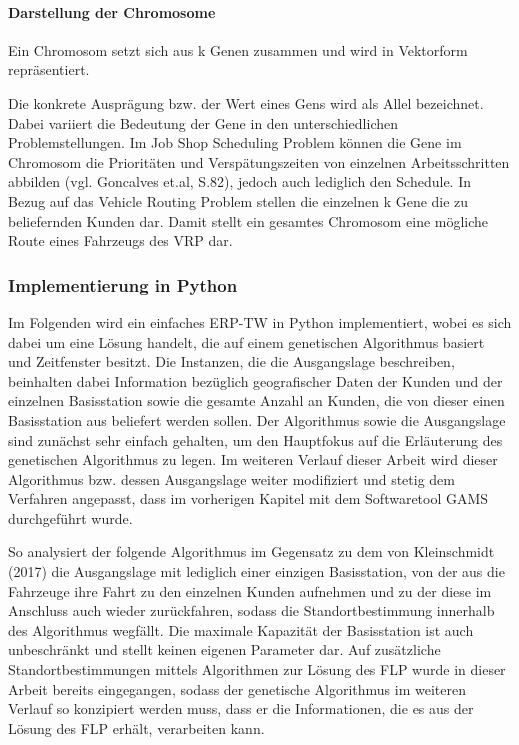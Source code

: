 \documentclass[a4paper,12pt,parskip,bibtotoc,liststotoc]{article}
\begin{document}
\paragraph{Darstellung der Chromosome}

Ein Chromosom setzt sich aus k Genen zusammen und wird in Vektorform repräsentiert. 

Die konkrete Ausprägung bzw. der Wert eines Gens wird als Allel bezeichnet.
Dabei variiert die Bedeutung der Gene in den unterschiedlichen Problemstellungen. 
Im Job Shop Scheduling Problem können die Gene im Chromosom die Prioritäten und Verspätungszeiten von einzelnen Arbeitsschritten abbilden (vgl. Goncalves et.al, S.82), jedoch auch lediglich den Schedule.
In Bezug auf das Vehicle Routing Problem stellen die einzelnen k Gene die zu beliefernden Kunden dar. 
Damit stellt ein gesamtes Chromosom eine mögliche Route eines Fahrzeugs des VRP dar. 


\subsubsection{Implementierung in Python}

Im Folgenden wird ein einfaches ERP-TW in Python implementiert, wobei es sich dabei um eine Lösung handelt, die auf einem genetischen Algorithmus basiert und Zeitfenster besitzt. 
Die Instanzen, die die Ausgangslage beschreiben, beinhalten dabei Information bezüglich geografischer Daten der Kunden und der einzelnen Basisstation sowie die gesamte Anzahl an Kunden, die von dieser einen Basisstation aus beliefert werden sollen.
Der Algorithmus sowie die Ausgangslage sind zunächst sehr einfach gehalten, um den Hauptfokus auf die Erläuterung des genetischen Algorithmus zu legen. 
Im weiteren Verlauf dieser Arbeit wird dieser Algorithmus bzw. dessen Ausgangslage weiter modifiziert und stetig dem Verfahren angepasst, dass im vorherigen Kapitel mit dem Softwaretool GAMS durchgeführt wurde.

So analysiert der folgende Algorithmus im Gegensatz zu dem von Kleinschmidt (2017) die Ausgangslage mit lediglich einer einzigen Basisstation, von der aus die Fahrzeuge ihre Fahrt zu den einzelnen Kunden aufnehmen und zu der diese im Anschluss auch wieder zurückfahren, sodass die Standortbestimmung innerhalb des Algorithmus wegfällt.
Die maximale Kapazität der Basisstation ist auch unbeschränkt und stellt keinen eigenen Parameter dar. 
Auf zusätzliche Standortbestimmungen mittels Algorithmen zur Lösung des FLP wurde in dieser Arbeit bereits eingegangen, sodass der genetische Algorithmus im weiteren Verlauf so konzipiert werden muss, dass er die Informationen, die es aus der Lösung des FLP erhält, verarbeiten kann.
\end{document}
